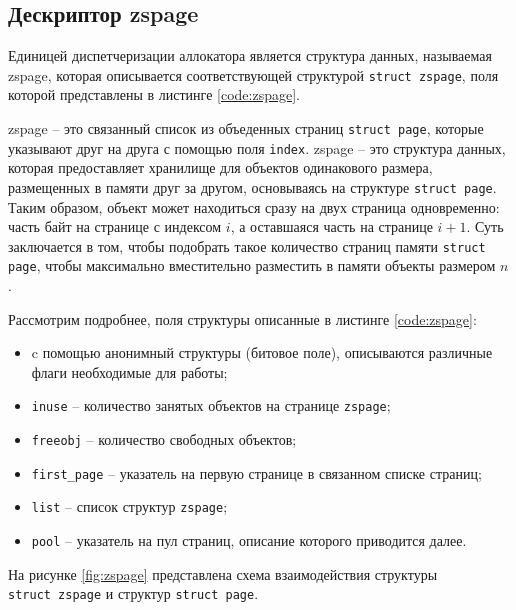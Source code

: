 \subsection{Дескриптор zspage}

Единицей диспетчеризации аллокатора является структура данных, называемая zspage, которая описывается соответствующей структурой \texttt{struct zspage}, поля которой представлены в листинге \ref{code:zspage}. 

\pagebreak


zspage -- это связанный список из объеденных страниц \texttt{struct page}, которые указывают друг на друга с помощью поля \texttt{index}. zspage -- это структура данных, которая предоставляет хранилище для объектов одинакового размера, размещенных в памяти друг за другом, основываясь на структуре \texttt{struct page}. Таким образом, объект может находиться сразу на двух страница одновременно: часть байт на странице с индексом $i$, а оставшаяся часть на странице $i + 1$. Суть заключается в том, чтобы подобрать такое количество страниц памяти \texttt{struct page}, чтобы максимально вместительно разместить в памяти объекты размером $n$.

Рассмотрим подробнее, поля структуры описанные в листинге \ref{code:zspage}:

\begin{itemize}
	\item c помощью анонимный структуры (битовое поле), описываются различные флаги необходимые для работы;
	\item \texttt{inuse} -- количество занятых объектов на странице \texttt{zspage};
	\item \texttt{freeobj} -- количество свободных объектов;
	\item \texttt{first\_page} -- указатель на первую странице в связанном списке страниц;
	\item \texttt{list} -- список структур \texttt{zspage};
	\item \texttt{pool} -- указатель на пул страниц, описание которого приводится далее.
\end{itemize}

На рисунке \ref{fig:zspage} представлена схема взаимодействия структуры\\ \texttt{struct zspage} и структур \texttt{struct page}.

